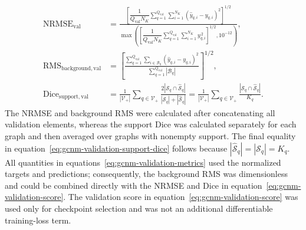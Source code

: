 \documentclass[11pt]{article}
\begin{document}
\begin{subequations}
\label{eq:gcnm-validation-metrics}
\begin{align}
    \operatorname{NRMSE}_{\mathrm{val}}
    &=
    \frac{
        \left[
            \dfrac{1}{Q_{\mathrm{val}}N_K}
            \sum_{q=1}^{Q_{\mathrm{val}}}
            \sum_{i=1}^{N_K}
            \left(\widehat y_{q,i}-y_{q,i}\right)^2
        \right]^{1/2}
    }{
        \max\!\left(
            \left[
                \dfrac{1}{Q_{\mathrm{val}}N_K}
                \sum_{q=1}^{Q_{\mathrm{val}}}
                \sum_{i=1}^{N_K}
                y_{q,i}^{\,2}
            \right]^{1/2},
            10^{-12}
        \right)
    },
    \label{eq:gcnm-validation-nrmse}\\
    \operatorname{RMS}_{\mathrm{background,val}}
    &=
    \left[
        \frac{
            \displaystyle
            \sum_{q=1}^{Q_{\mathrm{val}}}
            \sum_{i\in\mathcal B_q}
            \left(\widehat y_{q,i}-y_{q,i}\right)^2
        }{
            \displaystyle
            \sum_{q=1}^{Q_{\mathrm{val}}}|\mathcal B_q|
        }
    \right]^{1/2},
    \label{eq:gcnm-validation-background-rms}\\
    \operatorname{Dice}_{\mathrm{support,val}}
    &=
    \frac{1}{|\mathcal V_{+}|}
    \sum_{q\in\mathcal V_{+}}
    \frac{
        2\left|\mathcal S_q\cap\widehat{\mathcal S}_q\right|
    }{
        |\mathcal S_q|+|\widehat{\mathcal S}_q|
    }
    =
    \frac{1}{|\mathcal V_{+}|}
    \sum_{q\in\mathcal V_{+}}
    \frac{
        \left|\mathcal S_q\cap\widehat{\mathcal S}_q\right|
    }{
        K_q
    }.
    \label{eq:gcnm-validation-support-dice}
\end{align}
\end{subequations}
The NRMSE and background RMS were calculated after concatenating all validation elements, whereas the support Dice was calculated separately for each graph and then averaged over graphs with nonempty support.
The final equality in equation~\eqref{eq:gcnm-validation-support-dice} follows because $|\widehat{\mathcal S}_q|=|\mathcal S_q|=K_q$.
All quantities in equations~\eqref{eq:gcnm-validation-metrics} used the normalized targets and predictions; consequently, the background RMS was dimensionless and could be combined directly with the NRMSE and Dice in equation~\eqref{eq:gcnm-validation-score}.
The validation score in equation~\eqref{eq:gcnm-validation-score} was used only for checkpoint selection and was not an additional differentiable training-loss term.


\clearpage
\begingroup
\color{black}
\end{document}

